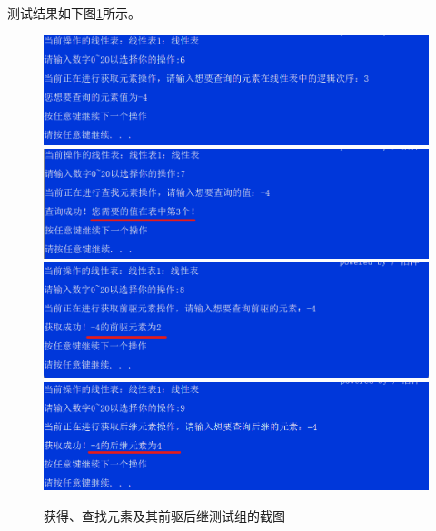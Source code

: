 \documentclass[supercite]{Experimental_Report}
\theoremstyle{definition}
\begin{document}
\begin{enumerate}
	测试结果如下图\ref{fig1-14}所示。
	\begin{figure}[htb] %
		\begin{center}
			\includegraphics[scale=0.6]{./images/顺序表/6.png}
			\includegraphics[scale=0.6]{./images/顺序表/7.png}
			\includegraphics[scale=0.6]{./images/顺序表/8.png}
			\includegraphics[scale=0.6]{./images/顺序表/9.png}
			\caption{获得、查找元素及其前驱后继测试组的截图}
			\label{fig1-14}
		\end{center}
	\end{figure}


\end{enumerate}
\end{document}
